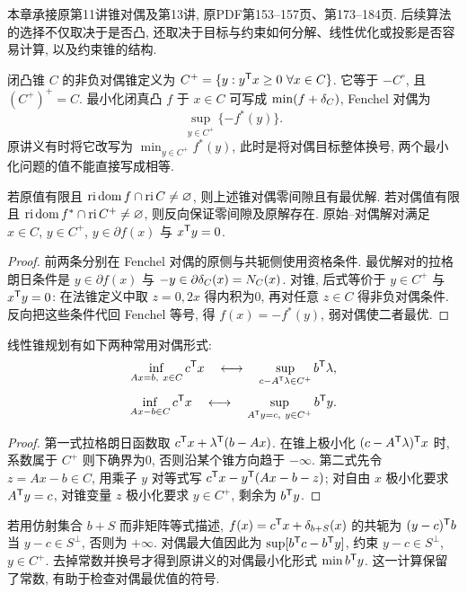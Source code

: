 \label{chap:6}
本章承接原第11讲锥对偶及第13讲, 原PDF第153--157页、第173--184页. 后续算法的选择不仅取决于是否凸, 还取决于目标与约束如何分解、线性优化或投影是否容易计算, 以及约束锥的结构.

闭凸锥 $C$ 的非负对偶锥定义为 $C^+=\{y:y^{\mathsf T} x\ge0\ \forall x\in C\}$. 它等于 $-C^\circ$, 且 $(C^+)^+=C$. 最小化闭真凸 $f$ 于 $x\in C$ 可写成 $\min(f+\delta_{C})$, Fenchel 对偶为
\[
\sup_{y\in C^+}\{-f^*(y)\}.
\]
原讲义有时将它改写为 $\min_{y\in C^+}f^*(y)$, 此时是将对偶目标整体换号, 两个最小化问题的值不能直接写成相等.

\begin{theorem}
若原值有限且 $\operatorname{ri}\operatorname{dom} f\cap\operatorname{ri} C\ne\varnothing$, 则上述锥对偶零间隙且有最优解. 若对偶值有限且 $\operatorname{ri}\operatorname{dom} f^*\cap\operatorname{ri} C^+\ne\varnothing$, 则反向保证零间隙及原解存在. 原始--对偶解对满足 $x\in C$, $y\in C^+$, $y\in\partial f(x)$ 与 $x^{\mathsf T} y=0$.
\end{theorem}
\begin{proof}
前两条分别在 Fenchel 对偶的原侧与共轭侧使用资格条件. 最优解对的拉格朗日条件是 $y\in\partial f(x)$ 与 $-y\in\partial\delta_{C}(x)=N_C(x)$. 对锥, 后式等价于 $y\in C^+$ 与 $x^{\mathsf T} y=0$: 在法锥定义中取 $z=0,2x$ 得内积为0, 再对任意 $z\in C$ 得非负对偶条件. 反向把这些条件代回 Fenchel 等号, 得 $f(x)=-f^*(y)$, 弱对偶使二者最优.
\end{proof}

\begin{proposition}\label{prop:conic-dual}
线性锥规划有如下两种常用对偶形式:
\[
\inf_{Ax=b,\ x\in C}c^{\mathsf T} x
\quad\longleftrightarrow\quad
\sup_{c-A^{\mathsf T}\lambda\in C^+}b^{\mathsf T}\lambda,
\]
\[
\inf_{Ax-b\in C}c^{\mathsf T} x
\quad\longleftrightarrow\quad
\sup_{A^{\mathsf T} y=c,\ y\in C^+}b^{\mathsf T} y.
\]
\end{proposition}
\begin{proof}
第一式拉格朗日函数取 $c^{\mathsf T} x+\lambda^{\mathsf T}(b-Ax)$. 在锥上极小化 $(c-A^{\mathsf T}\lambda)^{\mathsf T} x$ 时, 系数属于 $C^+$ 则下确界为0, 否则沿某个锥方向趋于 $-\infty$. 第二式先令 $z=Ax-b\in C$, 用乘子 $y$ 对等式写 $c^{\mathsf T} x-y^{\mathsf T}(Ax-b-z)$; 对自由 $x$ 极小化要求 $A^{\mathsf T} y=c$, 对锥变量 $z$ 极小化要求 $y\in C^+$, 剩余为 $b^{\mathsf T} y$.
\end{proof}
若用仿射集合 $b+S$ 而非矩阵等式描述, $f(x)=c^{\mathsf T} x+\delta_{b+S}(x)$ 的共轭为 $(y-c)^{\mathsf T} b$ 当 $y-c\in S^\perp$, 否则为 $+\infty$. 对偶最大值因此为 $\sup[b^{\mathsf T} c-b^{\mathsf T} y]$, 约束 $y-c\in S^\perp$, $y\in C^+$. 去掉常数并换号才得到原讲义的对偶最小化形式 $\min b^{\mathsf T} y$. 这一计算保留了常数, 有助于检查对偶最优值的符号.

